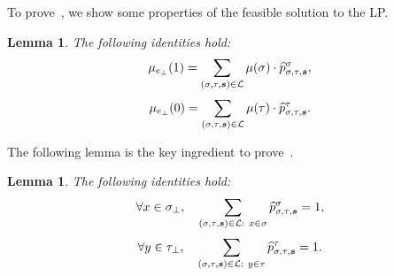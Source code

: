 \documentclass[11pt]{article}
\newtheorem{lemma}[theorem]{Lemma}
\newcommand{\seqS}{\boldsymbol{s}}
\begin{document}
To prove~, we show some properties of the feasible solution to the LP.

\begin{lemma} \label{lem:ratio-identity}
    The following identities hold:
    \begin{align*}
        \mu_{e_{\bot}}(1) = \sum_{(\sigma, \tau, \seqS) \in \+L}\mu(\sigma)\cdot\widehat{p}_{\sigma, \tau, \seqS}^{\sigma},
    \end{align*}
    \begin{align*}
        \mu_{e_{\bot}}(0)  = \sum_{(\sigma, \tau, \seqS) \in \+L}\mu(\tau)\cdot\widehat{p}_{\sigma, \tau, \seqS}^{\tau}.
    \end{align*}
\end{lemma}

The following lemma is the key ingredient to prove~.

\begin{lemma} \label{lem:ratio-identity-partial}
The following identities hold:
    \begin{align}\label{eqn-sum-leftside}
        \forall x\in \sigma_\bot, \quad \sum_{(\sigma,\tau, \seqS)\in \+L: \ x\in \sigma} \widehat{p}^{\sigma}_{\sigma,\tau,\seqS}=1,
    \end{align}
    \begin{align}\label{eqn-sum-rightside}
        \forall y\in \tau_\bot, \quad \sum_{(\sigma,\tau, \seqS)\in \+L: \ y\in \tau} \widehat{p}^{\tau}_{\sigma,\tau, \seqS}=1.
    \end{align}
\end{lemma}
\end{document}
